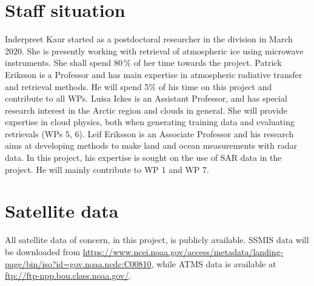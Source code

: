 \documentclass[12pt,oneside,a4paper]{article}
\begin{document}
\section{Staff situation}
%
\label{sec:staff}
Inderpreet Kaur started as a postdoctoral researcher in the division in March 2020. She is presently working with retrieval of atmospheric ice using microwave instruments. She shall spend 80\,\% of her time towards the project. Patrick Eriksson is a Professor and has main expertise in atmospheric radiative transfer and retrieval methods. He will spend 5\% of his time on this project and contribute to all WPs. Luisa Ickes is an Assistant Professor, and has special research interest in the Arctic region and clouds in general. She will provide expertise in cloud physics, both when generating training data and evaluating retrievals (WPs 5, 6). Leif Eriksson is an Associate Professor and his research aims at developing methods to make land and ocean measurements with radar data. In this project, his expertise is sought on the use of SAR data in the project. He will mainly contribute to WP 1 and WP 7. 

\section{Satellite data}
%
All satellite data of concern, in this project, is publicly available. SSMIS data will be downloaded from \url{ https://www.ncei.noaa.gov/access/metadata/landing-page/bin/iso?id=gov.noaa.ncdc:C00810}, while ATMS data is available at \url{ftp://ftp-npp.bou.class.noaa.gov/}.

{\footnotesize
	
}
\end{document}
